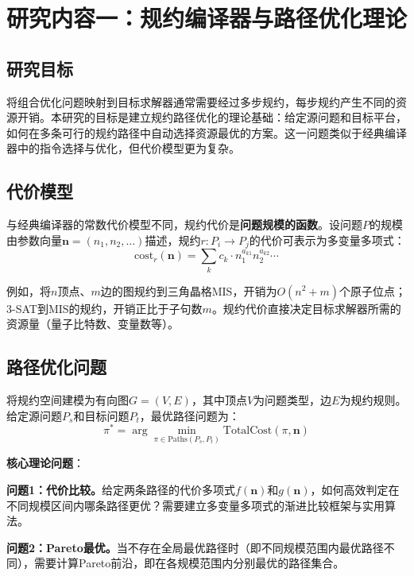 \section{研究内容一：规约编译器与路径优化理论}

\subsection{研究目标}

将组合优化问题映射到目标求解器通常需要经过多步规约，每步规约产生不同的资源开销。本研究的目标是建立规约路径优化的理论基础：给定源问题和目标平台，如何在多条可行的规约路径中自动选择资源最优的方案。这一问题类似于经典编译器中的指令选择与优化，但代价模型更为复杂。

\subsection{代价模型}

与经典编译器的常数代价模型不同，规约代价是\textbf{问题规模的函数}。设问题$P$的规模由参数向量$\mathbf{n} = (n_1, n_2, \ldots)$描述，规约$r: P_i \to P_j$的代价可表示为多变量多项式：
\begin{equation}
	\text{cost}_r(\mathbf{n}) = \sum_{k} c_k \cdot n_1^{a_{k1}} n_2^{a_{k2}} \cdots
\end{equation}

例如，将$n$顶点、$m$边的图规约到三角晶格MIS，开销为$O(n^2 + m)$个原子位点；3-SAT到MIS的规约，开销正比于子句数$m$。规约代价直接决定目标求解器所需的资源量（量子比特数、变量数等）。

\subsection{路径优化问题}

将规约空间建模为有向图$G = (V, E)$，其中顶点$V$为问题类型，边$E$为规约规则。给定源问题$P_s$和目标问题$P_t$，最优路径问题为：
\begin{equation}
	\pi^* = \arg\min_{\pi \in \text{Paths}(P_s, P_t)} \text{TotalCost}(\pi, \mathbf{n})
\end{equation}

\textbf{核心理论问题}：

\textbf{问题1：代价比较。}给定两条路径的代价多项式$f(\mathbf{n})$和$g(\mathbf{n})$，如何高效判定在不同规模区间内哪条路径更优？需要建立多变量多项式的渐进比较框架与实用算法。

\textbf{问题2：Pareto最优。}当不存在全局最优路径时（即不同规模范围内最优路径不同），需要计算Pareto前沿，即在各规模范围内分别最优的路径集合。

